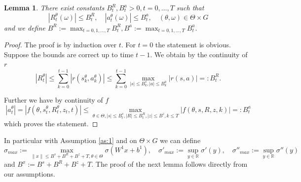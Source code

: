 \documentclass[reqno, 11pt]{amsart}%
\newcommand\RR{\mathbb R}
\newtheorem{lemma}[theorem]{Lemma}
\theoremstyle{definition}
\begin{document}
\begin{lemma}\label{lem:boundssa}
    There exist constants $B_t^R,B_t^a>0, t=0,\ldots,T$ such that
    \begin{equation}
         |R_t^\theta(\omega)| \le B_t^R,\quad  |a_t^\theta(\omega)|\le B_t^a, \quad (\theta,\omega)\in\Theta\times G
    \end{equation}
    and we define $B^R := \max_{t=0,1,\ldots,T} B_t^R, B^a := \max_{t=0,1,\ldots,T} B_t^a.$ 
\end{lemma}

\begin{proof}
    The proof is by induction over $t$. For $t=0$ the statement is obvious. Suppose the bounds are correct up to time $t-1.$ We obtain by the continuity of $r$
   \begin{equation}
    |R_t^\theta| \le \sum_{k=0}^{t-1} |r(s_k^\theta,a_k^\theta)| \le \sum_{k=0}^{t-1} \max_{|s|\le B^s_k, |a|\le B^a_{k}}|r(s,a)| =: B^R_t. 
\end{equation} 

Further we have by continuity of $f$
\begin{equation}
    |a_t^\theta| = |f(\theta,s_t^\theta,R_t^\theta,z_t,t)|\le 
    \max_{\theta\in\Theta, |s|\le B_t^s, |R|\le B_t^R, |z|\le B^z, k\le T} |f(\theta,s,R,z,k)| =: B^a_t
\end{equation}
which proves the statement.
\end{proof}
In particular with Assumption \ref{as:1} and on $\Theta\times G$ we can define 
$$\sigma_{max} :=  \max_{\|x\|\le B^s+B^R+B^z+T,\theta\in\Theta}\sigma(W^1 x+b^1),\quad \sigma'_{max} := \sup_{y\in\RR} \sigma'(y), \quad \sigma''_{max} := \sup_{y\in\RR} \sigma''(y)$$
and $B^x := B^s+B^R+B^z+T.$
The proof of the next lemma follows directly from our assumptions.
\end{document}
